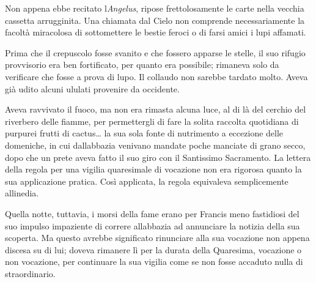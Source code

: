 Non appena ebbe recitato l\textquotesingle{}\emph{Angelus}, ripose
frettolosamente le carte nella vecchia cassetta arrugginita. Una
chiamata dal Cielo non comprende necessariamente la facoltà miracolosa
di sottomettere le bestie feroci o di farsi amici i lupi affamati.

Prima che il crepuscolo fosse svanito e che fossero apparse le stelle,
il suo rifugio provvisorio era ben fortificato, per quanto era
possibile; rimaneva solo da verificare che fosse a prova di lupo. Il
collaudo non sarebbe tardato molto. Aveva già udito alcuni ululati
provenire da occidente.

Aveva ravvivato il fuoco, ma non era rimasta alcuna luce, al di là del
cerchio del riverbero delle fiamme, per permettergli di fare la solita
raccolta quotidiana di purpurei frutti di cactus\ldots{} la sua sola
fonte di nutrimento a eccezione delle domeniche, in cui
dall\textquotesingle abbazia venivano mandate poche manciate di grano
secco, dopo che un prete aveva fatto il suo giro con il Santissimo
Sacramento. La lettera della regola per una vigilia quaresimale di
vocazione non era rigorosa quanto la sua applicazione pratica. Così
applicata, la regola equivaleva semplicemente
all\textquotesingle inedia.

Quella notte, tuttavia, i morsi della fame erano per Francis meno
fastidiosi del suo impulso impaziente di correre
all\textquotesingle abbazia ad annunciare la notizia della sua scoperta.
Ma questo avrebbe significato rinunciare alla sua vocazione non appena
discesa su di lui; doveva rimanere lì per la durata della Quaresima,
vocazione o non vocazione, per continuare la sua vigilia come se non
fosse accaduto nulla di straordinario.

